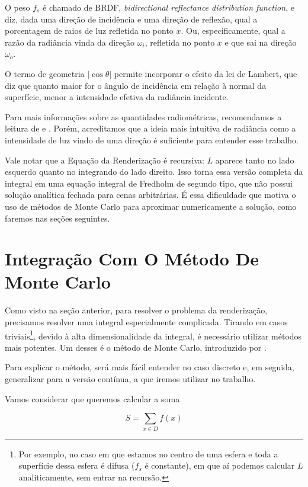O peso $f_s$ é chamado de BRDF, \emph{bidirectional reflectance distribution
function}, e diz, dada uma direção de incidência e uma direção de reflexão, qual
a porcentagem de raios de luz refletida no ponto $x$. Ou, especificamente, qual
a razão da radiância vinda da direção $\omega_i$, refletida no ponto $x$ e que
sai na direção $\omega_o$.

O termo de geometria $| \cos \theta |$ permite incorporar o efeito da lei
de Lambert, que diz que quanto maior for o ângulo de incidência em relação à
normal da superfície, menor a intensidade efetiva da radiância incidente.

Para mais informações sobre as quantidades radiométricas, recomendamos a
leitura de \citet[Cap. 5]{pbrt4} e \citet[Cap. 3]{veach97}. Porém, acreditamos
que a ideia mais intuitiva de radiância como a intensidade de luz vindo de uma
direção é suficiente para entender esse trabalho.

Vale notar que a Equação da Renderização é recursiva: $L$ aparece tanto no lado
esquerdo quanto no integrando do lado direito. Isso torna essa versão completa
da integral em uma equação integral de Fredholm de segundo tipo, que não possui
solução analítica fechada para cenas arbitrárias. É essa dificuldade que motiva
o uso de métodos de Monte Carlo para aproximar numericamente a solução, como
faremos nas seções seguintes.

\section{Integração Com O Método De Monte Carlo}

Como visto na seção anterior, para resolver o problema da renderização,
precisamos resolver uma integral especialmente complicada. Tirando em casos
triviais\footnote{Por exemplo, no caso em que estamos no centro de uma esfera e
toda a superfície dessa esfera é difusa ($f_s$ é constante), em que aí podemos
calcular $L$ analiticamente, sem entrar na recursão.}, devido
à alta dimensionalidade da integral, é necessário utilizar métodos mais
potentes. Um desses é o método de Monte Carlo, introduzido por
\citet{metropolis49}.

Para explicar o método, será mais fácil entender no caso discreto e, em
seguida, generalizar para a versão contínua, a que iremos utilizar no trabalho.

Vamos considerar que queremos calcular a soma

\[
  S = \sum_{x \in D} f(x)
\]


